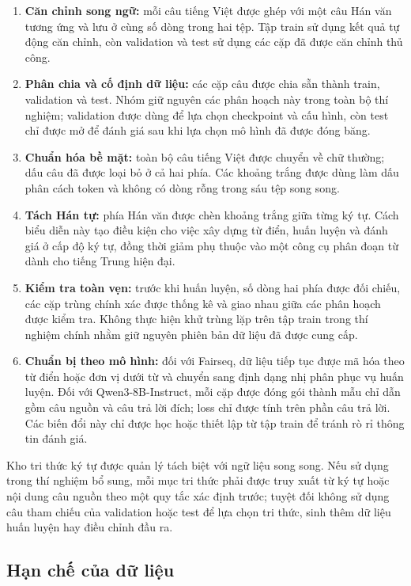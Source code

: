 \begin{enumerate}
    \item \textbf{Căn chỉnh song ngữ:} mỗi câu tiếng Việt được ghép với một câu Hán văn tương ứng và lưu ở cùng số dòng trong hai tệp. Tập train sử dụng kết quả tự động căn chỉnh, còn validation và test sử dụng các cặp đã được căn chỉnh thủ công.
    \item \textbf{Phân chia và cố định dữ liệu:} các cặp câu được chia sẵn thành train, validation và test. Nhóm giữ nguyên các phân hoạch này trong toàn bộ thí nghiệm; validation được dùng để lựa chọn checkpoint và cấu hình, còn test chỉ được mở để đánh giá sau khi lựa chọn mô hình đã được đóng băng.
    \item \textbf{Chuẩn hóa bề mặt:} toàn bộ câu tiếng Việt được chuyển về chữ thường; dấu câu đã được loại bỏ ở cả hai phía. Các khoảng trắng được dùng làm dấu phân cách token và không có dòng rỗng trong sáu tệp song song.
    \item \textbf{Tách Hán tự:} phía Hán văn được chèn khoảng trắng giữa từng ký tự. Cách biểu diễn này tạo điều kiện cho việc xây dựng từ điển, huấn luyện và đánh giá ở cấp độ ký tự, đồng thời giảm phụ thuộc vào một công cụ phân đoạn từ dành cho tiếng Trung hiện đại.
    \item \textbf{Kiểm tra toàn vẹn:} trước khi huấn luyện, số dòng hai phía được đối chiếu, các cặp trùng chính xác được thống kê và giao nhau giữa các phân hoạch được kiểm tra. Không thực hiện khử trùng lặp trên tập train trong thí nghiệm chính nhằm giữ nguyên phiên bản dữ liệu đã được cung cấp.
    \item \textbf{Chuẩn bị theo mô hình:} đối với Fairseq, dữ liệu tiếp tục được mã hóa theo từ điển hoặc đơn vị dưới từ và chuyển sang định dạng nhị phân phục vụ huấn luyện. Đối với Qwen3-8B-Instruct, mỗi cặp được đóng gói thành mẫu chỉ dẫn gồm câu nguồn và câu trả lời đích; loss chỉ được tính trên phần câu trả lời. Các biến đổi này chỉ được học hoặc thiết lập từ tập train để tránh rò rỉ thông tin đánh giá.
\end{enumerate}

Kho tri thức ký tự được quản lý tách biệt với ngữ liệu song song. Nếu sử dụng trong thí nghiệm bổ sung, mỗi mục tri thức phải được truy xuất từ ký tự hoặc nội dung câu nguồn theo một quy tắc xác định trước; tuyệt đối không sử dụng câu tham chiếu của validation hoặc test để lựa chọn tri thức, sinh thêm dữ liệu huấn luyện hay điều chỉnh đầu ra.

\subsection{Hạn chế của dữ liệu}

